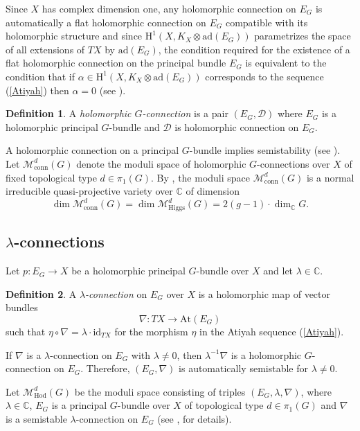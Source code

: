 \documentclass[11pt, reqno]{amsart}
\numberwithin{equation}{section}
\theoremstyle{definition}
\newtheorem{definition}{Definition}
\begin{document}
	Since $X$ has complex dimension one, any holomorphic connection on $E_G$ is automatically a flat holomorphic connection on $E_G$ compatible with its holomorphic structure and since $\mathrm{H}^1(X, K_X \otimes \mathrm{ad}(E_G))$ parametrizes the space of all extensions of $TX$ by $\mathrm{ad}(E_G)$, the condition required for the existence of a flat holomorphic connection on the principal bundle $E_G$ is equivalent to the condition that if $\alpha \in \mathrm{H}^1(X, K_X \otimes \mathrm{ad}(E_G))$ corresponds to the sequence (\ref{Atiyah}) then $\alpha=0$ (see \cite{AB02}). 
	
	\begin{definition}
		A \textit{holomorphic $G$-connection} is a pair $(E_G,\mathcal{D})$ where $E_G$ is a holomorphic principal $G$-bundle and $\mathcal{D}$ is holomorphic connection on $E_G$.
	\end{definition}
	A holomorphic connection on a principal $G$-bundle implies semistability (see \cite{AB02}). Let $\mathcal{M}^d_\mathrm{conn}(G)$ denote the moduli space of holomorphic $G$-connections over $X$ of fixed topological type $d\in \pi_1(G)$. By \cite{BGH13}, the moduli space $\mathcal{M}^d_\mathrm{conn}(G)$ is a normal irreducible quasi-projective variety over $\mathbb{C}$ of dimension $$\dim \mathcal{M}^d_{\mathrm{conn}}(G)= \dim \mathcal{M}^d_{\mathrm{Higgs}}(G)= 2(g-1)\cdot \dim_{\mathbb{C}} G.$$ 

	
	
	

	
	\subsection{$\lambda$-connections}
		Let $p : E_G \to X$ be a holomorphic principal $G$-bundle over $X$ and let $\lambda \in \mathbb{C}$.
		
		\begin{definition}
		A $\lambda$\textit{-connection} on $E_G$ over $X$ is a holomorphic map of vector bundles
		\[
		\nabla : TX \longrightarrow \mathrm{At}(E_G)
		\]
		such that $\eta \circ \nabla = \lambda\cdot \mathrm{id}_{TX}$ for the morphism $\eta$ in the Atiyah sequence (\ref{Atiyah}).
		\end{definition}
		If $\nabla$ is a $\lambda$-connection on $E_G$ with $\lambda \ne 0$, then $\lambda^{-1}\nabla$ is a holomorphic $G$-connection on $E_G$. Therefore, $(E_G,\nabla)$ is automatically semistable for $\lambda \ne 0$. 
		
		Let $\mathcal{M}^d_\mathrm{Hod}(G)$ be the moduli space consisting of triples $(E_G,\lambda,\nabla)$, where $\lambda \in \mathbb{C}$, $E_G$ is a principal $G$-bundle over $X$ of topological type $d\in \pi_1(G)$ and $\nabla$ is a semistable $\lambda$-connection on $E_G$ (see \cite{S94}, \cite{BGH13} for details).
	
\end{document}
